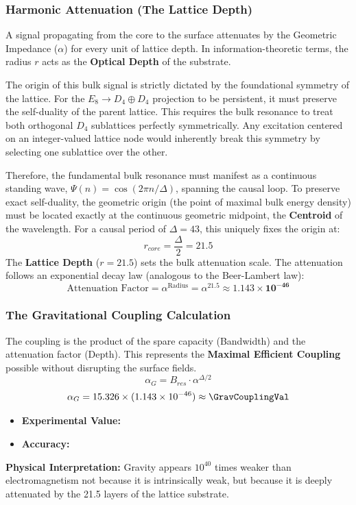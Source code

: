 \subsubsection{Harmonic Attenuation (The Lattice Depth)}
A signal propagating from the core to the surface attenuates by the Geometric Impedance ($\alpha$) for every unit of lattice depth. In information-theoretic terms, the radius $r$ acts as the \textbf{Optical Depth} of the substrate.

The origin of this bulk signal is strictly dictated by the foundational symmetry of the lattice. For the $E_8 \to D_4 \oplus D_4$ projection to be persistent, it must preserve the self-duality of the parent lattice. This requires the bulk resonance to treat both orthogonal $D_4$ sublattices perfectly symmetrically. Any excitation centered on an integer-valued lattice node would inherently break this symmetry by selecting one sublattice over the other. 

Therefore, the fundamental bulk resonance must manifest as a continuous standing wave, $\Psi(n) = \cos(2\pi n / \Delta)$, spanning the causal loop. To preserve exact self-duality, the geometric origin (the point of maximal bulk energy density) must be located exactly at the continuous geometric midpoint, the \textbf{Centroid} of the wavelength. For a causal period of $\Delta=43$, this uniquely fixes the origin at:
\begin{equation}
r_{core} = \frac{\Delta}{2} = 21.5
\end{equation}
The \textbf{Lattice Depth} ($r=21.5$) sets the bulk attenuation scale. The attenuation follows an exponential decay law (analogous to the Beer-Lambert law):
\begin{equation}
\text{Attenuation Factor} = \alpha^{\text{Radius}} = \alpha^{21.5} \approx \mathbf{1.143 \times 10^{-46}}
\end{equation}

\subsubsection{The Gravitational Coupling Calculation}
The coupling is the product of the spare capacity (Bandwidth) and the attenuation factor (Depth). This represents the \textbf{Maximal Efficient Coupling} possible without disrupting the surface fields.
\begin{equation}
\alpha_G = B_{res} \cdot \alpha^{\Delta/2}
\end{equation}
\begin{equation}
\alpha_G = 15.326 \times (1.143 \times 10^{-46}) \approx \mathbf{\GravCouplingVal}
\end{equation}
\begin{itemize}
    \item \textbf{Experimental Value:} \GravCouplingExperimentalValue
    \item \textbf{Accuracy:} \GravCouplingAccText
\end{itemize}
\textbf{Physical Interpretation:} Gravity appears $10^{40}$ times weaker than electromagnetism not because it is intrinsically weak, but because it is deeply attenuated by the 21.5 layers of the lattice substrate.

